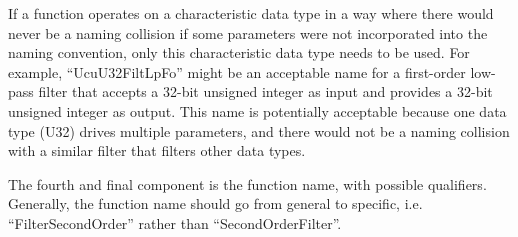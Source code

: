 If a function operates on a characteristic data type in a 
way where there would never be a naming collision if some 
parameters were not incorporated into the naming convention, 
only this characteristic data type needs to be used.  For 
example, ``UcuU32FiltLpFo'' might be an acceptable name for 
a first-order low-pass filter that accepts a 32-bit unsigned 
integer as input and provides a 32-bit unsigned integer as 
output.  This name is potentially acceptable because one 
data type (U32) drives multiple parameters, and there would 
not be a naming collision with a similar filter that filters 
other data types.  

The fourth and final component is the function name, with 
possible qualifiers.  Generally, the function name should go 
from general to specific, i.e.  ``FilterSecondOrder'' rather 
than ``SecondOrderFilter''.  

